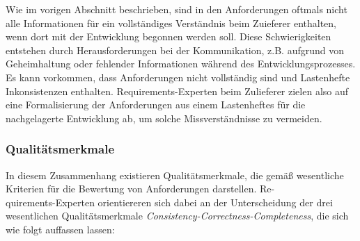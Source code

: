 \documentclass[12pt]{report}
\begin{document}
Wie im vorigen Abschnitt beschrieben, sind in den Anforderungen oftmals nicht alle Informationen für ein vollständiges Verständnis beim Zuieferer enthalten, wenn dort mit der Entwicklung begonnen werden soll. Diese Schwierigkeiten entstehen durch Herausforderungen bei der Kommunikation, z.B. aufgrund von Geheimhaltung oder fehlender Informationen während des Entwicklungsprozesses. Es kann vorkommen, dass Anforderungen nicht vollständig sind und Lastenhefte Inkonsistenzen enthalten.  Requirements-Experten beim Zulieferer zielen also auf eine Formalisierung der Anforderungen aus einem Lastenheftes für die nachgelagerte Entwicklung ab, um solche Missverständnisse zu vermeiden. 

\subsubsection{Qualitätsmerkmale}
In diesem Zusammenhang existieren Qualitätsmerkmale, die gemäß \cite{zg02} wesentliche Kriterien für die Bewertung von Anforderungen darstellen. Re- \\quirements-Experten orientiereren sich dabei an der Unterscheidung der drei wesentlichen Qualitätsmerkmale \textit{Consistency-Correctness-Completeness}, die sich wie folgt auffassen lassen:
\end{document}
